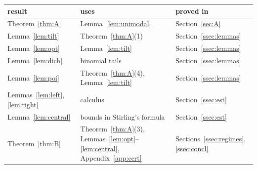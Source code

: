 \documentclass[11pt]{amsart}
\theoremstyle{remark}
\begin{document}
\begin{center}
\begin{tabular}{lll}
\toprule
result & uses & proved in \\
\midrule
Theorem~\ref{thm:A} & Lemma~\ref{lem:unimodal} & Section~\ref{sec:A} \\
Lemma~\ref{lem:tilt} & Theorem~\ref{thm:A}(1) & Section~\ref{ssec:lemmas} \\
Lemma~\ref{lem:opt} & Lemma~\ref{lem:tilt} & Section~\ref{ssec:lemmas} \\
Lemma~\ref{lem:dich} & binomial tails & Section~\ref{ssec:lemmas} \\
Lemma~\ref{lem:poi} & Theorem~\ref{thm:A}(4), Lemma~\ref{lem:tilt} & Section~\ref{ssec:lemmas} \\
Lemmas~\ref{lem:left}, \ref{lem:right} & calculus & Section~\ref{ssec:est} \\
Lemma~\ref{lem:central} & bounds in Stirling's formula~\cite{Rob55} & Section~\ref{ssec:est} \\
Theorem~\ref{thm:B} & Theorem~\ref{thm:A}(3), Lemmas~\ref{lem:opt}--\ref{lem:central}, Appendix~\ref{app:cert} & Sections~\ref{ssec:regimes}, \ref{ssec:concl} \\
\bottomrule
\end{tabular}
\end{center}
\end{document}
